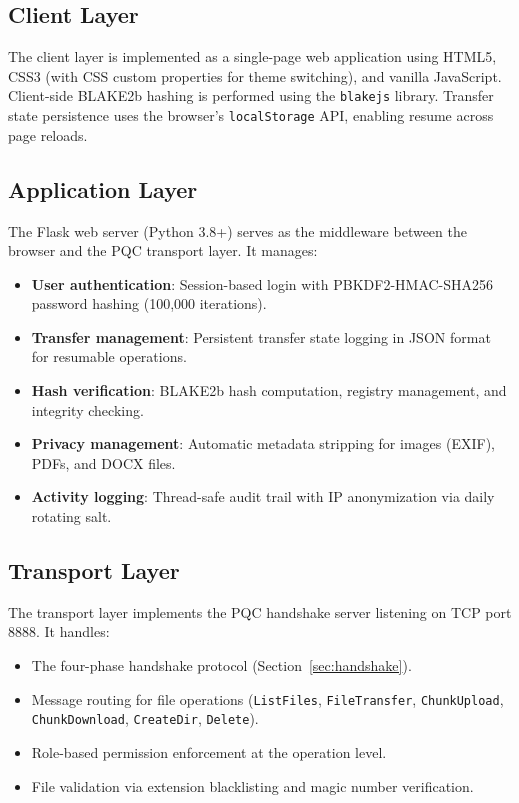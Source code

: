 \documentclass[12pt, a4paper]{article}
\begin{document}
\subsection{Client Layer}

The client layer is implemented as a single-page web application using HTML5, CSS3 (with CSS custom properties for theme switching), and vanilla JavaScript. Client-side BLAKE2b hashing is performed using the \texttt{blakejs} library. Transfer state persistence uses the browser's \texttt{localStorage} API, enabling resume across page reloads.

\subsection{Application Layer}

The Flask web server (Python 3.8+) serves as the middleware between the browser and the PQC transport layer. It manages:

\begin{itemize}[itemsep=2pt]
    \item \textbf{User authentication}: Session-based login with PBKDF2-HMAC-SHA256 password hashing (100,000 iterations).
    \item \textbf{Transfer management}: Persistent transfer state logging in JSON format for resumable operations.
    \item \textbf{Hash verification}: BLAKE2b hash computation, registry management, and integrity checking.
    \item \textbf{Privacy management}: Automatic metadata stripping for images (EXIF), PDFs, and DOCX files.
    \item \textbf{Activity logging}: Thread-safe audit trail with IP anonymization via daily rotating salt.
\end{itemize}

\subsection{Transport Layer}

The transport layer implements the PQC handshake server listening on TCP port 8888. It handles:

\begin{itemize}[itemsep=2pt]
    \item The four-phase handshake protocol (Section~\ref{sec:handshake}).
    \item Message routing for file operations (\texttt{ListFiles}, \texttt{FileTransfer}, \texttt{ChunkUpload}, \texttt{ChunkDownload}, \texttt{CreateDir}, \texttt{Delete}).
    \item Role-based permission enforcement at the operation level.
    \item File validation via extension blacklisting and magic number verification.
\end{itemize}
\end{document}
